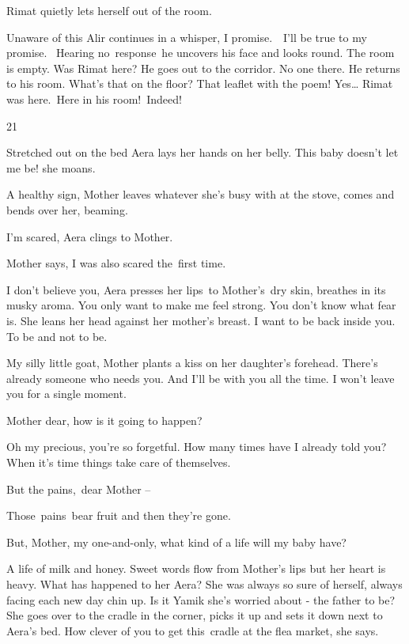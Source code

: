 \documentclass[twoside,11pt]{book}
\begin{document}
Rimat quietly lets herself out of the room.

Unaware of this Alir continues in a whisper, {\textquotedbl}I promise.\ \ I'll be true to my promise.{\textquotedbl}~
Hearing no\ response\ he uncovers his face and looks round. The room is empty. Was Rimat here? He goes out to the
corridor. No one there. He returns to his room. What's that on the floor? That leaflet with the poem! Yes{\dots} Rimat
was here.\ Here in his room!\ Indeed!


\bigskip

21 

Stretched out on the bed Aera lays her hands on her belly. {\textquotedbl}This baby doesn't let me be!{\textquotedbl}
she moans.

{\textquotedbl}A healthy sign,{\textquotedbl} Mother leaves whatever she's busy with at the stove, comes and bends over
her, beaming. 

{\textquotedbl}I'm scared,{\textquotedbl} Aera clings to Mother{.}

Mother says, {\textquotedbl}I was also scared the{\ }first time.{\textquotedbl} 

{\textquotedbl}I don't believe you,{\textquotedbl} Aera presses her lips{\ }to Mother's~dry skin,
breathes in its musky aroma. {\textquotedbl}You only want to make me feel strong. You don't know what fear
is.{\textquotedbl} She leans her head against her mother's breast. {\textquotedbl}I want to be back inside you. To be
and not to be.{\textquotedbl} 

{\textquotedbl}My silly little goat,{\textquotedbl} Mother plants a kiss on her daughter's forehead.
{\textquotedbl}There's already someone who needs you. And I'll be with you all the time. I won't leave you for a single
moment.{\textquotedbl} 

{\textquotedbl}Mother dear, how is it going to happen?{\textquotedbl} 

{\textquotedbl}Oh my precious, you're so forgetful. How many times have I already told you? When it's time things take
care of themselves.{\textquotedbl} 

{\textquotedbl}But the pains,~dear Mother -- {\textquotedbl} 

{\textquotedbl}Those~pains~bear fruit and then they're gone.{\textquotedbl} 

{\textquotedbl}But, Mother, my one-and-only, what kind of a life will my baby have?{\textquotedbl} 

{\textquotedbl}A life of milk and honey.{\textquotedbl} Sweet words flow from Mother's lips but her heart is heavy. What
has happened to her Aera? She was always so sure of herself, always facing each new day chin up. Is it Yamik she's
worried about - the father to be? She goes over to the cradle in the corner, picks it up and sets it down next to
Aera's bed. {\textquotedbl}How clever of you to get this\ cradle at the flea market,{\textquotedbl} she says.
\end{document}
